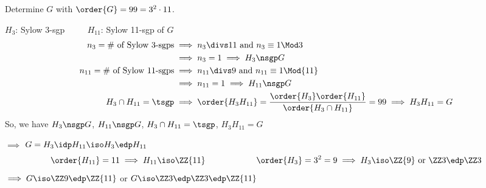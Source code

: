 \begin{example}
    Determine \(G\) with \(\order{G} = 99 = 3^2 \cdot 11\).

    \(H_3\): Sylow 3-sgp \(\qquad\) \(H_{11}\): Sylow 11-sgp of \(G\)
    \begin{align*}
        n_3 = \text{\# of Sylow 3-sgps} &\implies n_3\divs 11 \text{ and } n_3 \equiv 1 \Mod 3 \\
        &\implies n_3 = 1 \implies H_3 \nsgp G \\
        n_{11} = \text{\# of Sylow 11-sgps} &\implies n_{11}\divs 9 \text{ and } n_{11} \equiv 1 \Mod {11} \\
        &\implies n_{11} = 1 \implies H_{11} \nsgp G \\
        H_3\cap H_{11} = \tsgp &\implies \order{H_3H_{11}} = \frac{\order{H_3}\order{H_{11}}}{\order{H_3\cap H_{11}}} = 99 \implies H_3H_{11}= G
    \end{align*}
    So, we have \(H_3\nsgp G\), \(H_{11}\nsgp G\), \(H_3\cap H_{11} = \tsgp\), \(H_3H_{11} = G \)

    \(\implies\) \(G = H_3\idp H_{11} \iso H_3 \edp H_{11}\)
    \begin{align*}
        \order{H_{11}} = 11 \implies H_{11}\iso \ZZ{11} \qquad\qquad\qquad \order{H_3} = 3^2 = 9\implies H_3 \iso \ZZ{9}\text{ or } \ZZ 3\edp \ZZ 3
    \end{align*}
    \(\implies G\iso \ZZ9\edp \ZZ{11}\) or \(G\iso\ZZ 3\edp \ZZ 3\edp \ZZ{11}\)
\end{example}